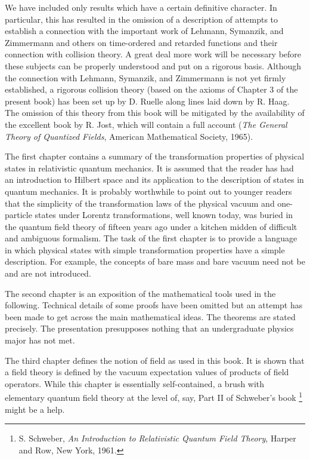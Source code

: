 We have included only results which have a certain definitive character. In particular, this has resulted in the omission of a description of attempts to establish a connection with the important work of Lehmann, Symanzik, and Zimmermann and others on time-ordered and retarded functions and their connection with collision theory. A great deal more work will be necessary before these subjects can be properly understood and put on a rigorous basis. Although the connection with Lehmann, Symanzik, and Zimmermann is not yet firmly established, a rigorous collision theory (based on the axioms of Chapter 3 of the present book) has been set up by D. Ruelle along lines laid down by R. Haag. The omission of this theory from this book will be mitigated by the availability of the excellent book by R. Jost, which will contain a full account (\emph{The General Theory of Quantized Fields}, American Mathematical Society, 1965).

The first chapter contains a summary of the transformation properties of physical states in relativistic quantum mechanics. It is assumed that the reader has had an introduction to Hilbert space and its application to the description of states in quantum mechanics. It is probably worthwhile to point out to younger readers that the simplicity of the transformation laws of the physical vacuum and one-particle states under Lorentz transformations, well known today, was buried in the quantum field theory of fifteen years ago under a kitchen midden of difficult and ambiguous formalism. The task of the first chapter is to provide a language in which physical states with simple transformation properties have a simple description. For example, the concepts of bare mass and bare vacuum need not be and are not introduced.

The second chapter is an exposition of the mathematical tools used in the following. Technical details of some proofs have been omitted but an attempt has been made to get across the main mathematical ideas. The theorems are stated precisely. The presentation presupposes nothing that an undergraduate physics major has not met.

The third chapter defines the notion of field as used in this book. It is shown that a field theory is defined by the vacuum expectation values of products of field operators. While this chapter is essentially self-contained, a brush with elementary quantum field theory at the level of, say, Part II of Schweber's book
\begingroup
\renewcommand{\thefootnote}{\ensuremath{\dagger}}%
\footnote{S. Schweber, \emph{An Introduction to Relativistic Quantum Field Theory}, Harper and Row, New York, 1961.}
\endgroup
might be a help.

